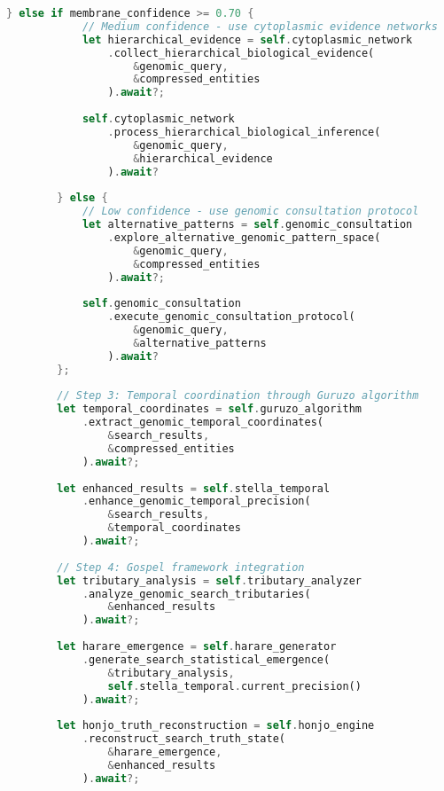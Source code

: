 \documentclass[12pt,a4paper]{article}
\begin{document}
\begin{lstlisting}[language=Rust, caption=Integrated Mufakose-Gospel Genomic Search System]
        } else if membrane_confidence >= 0.70 {
            // Medium confidence - use cytoplasmic evidence networks
            let hierarchical_evidence = self.cytoplasmic_network
                .collect_hierarchical_biological_evidence(
                    &genomic_query,
                    &compressed_entities
                ).await?;
            
            self.cytoplasmic_network
                .process_hierarchical_biological_inference(
                    &genomic_query,
                    &hierarchical_evidence
                ).await?
                
        } else {
            // Low confidence - use genomic consultation protocol
            let alternative_patterns = self.genomic_consultation
                .explore_alternative_genomic_pattern_space(
                    &genomic_query,
                    &compressed_entities
                ).await?;
            
            self.genomic_consultation
                .execute_genomic_consultation_protocol(
                    &genomic_query,
                    &alternative_patterns
                ).await?
        };
        
        // Step 3: Temporal coordination through Guruzo algorithm
        let temporal_coordinates = self.guruzo_algorithm
            .extract_genomic_temporal_coordinates(
                &search_results,
                &compressed_entities
            ).await?;
        
        let enhanced_results = self.stella_temporal
            .enhance_genomic_temporal_precision(
                &search_results,
                &temporal_coordinates
            ).await?;
        
        // Step 4: Gospel framework integration
        let tributary_analysis = self.tributary_analyzer
            .analyze_genomic_search_tributaries(
                &enhanced_results
            ).await?;
        
        let harare_emergence = self.harare_generator
            .generate_search_statistical_emergence(
                &tributary_analysis,
                self.stella_temporal.current_precision()
            ).await?;
        
        let honjo_truth_reconstruction = self.honjo_engine
            .reconstruct_search_truth_state(
                &harare_emergence,
                &enhanced_results
            ).await?;
        

\end{lstlisting}
\end{document}
